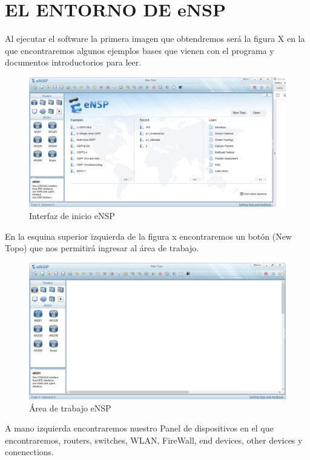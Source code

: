 \documentclass[journal]{IEEEtran}
\begin{document}
\section{EL ENTORNO DE eNSP}
Al ejecutar el software la primera imagen que obtendremos será la figura X en la que encontraremos algunos ejemplos bases que vienen con el programa y documentos introductorios para leer.
\begin{center}
\begin{figure}[H]
\centering
\includegraphics[scale=0.2]{0.JPG} 
\caption{Interfaz de inicio eNSP}
\end{figure}
\end{center}
En la esquina superior izquierda de la figura x encontraremos un botón (New Topo) que nos permitirá ingresar al área de trabajo.
\begin{center}
\begin{figure}[H]
\centering
\includegraphics[scale=0.23]{1.JPG} 
\caption{Área de trabajo eNSP}
\end{figure}
\end{center}
A mano izquierda encontraremos nuestro Panel de dispositivos en el que encontraremos, routers, switches, WLAN, FireWall, end devices, other devices y conenections.
\end{document}
